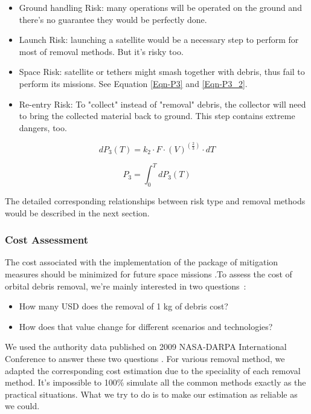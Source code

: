 \documentclass{mcmthesis}
\begin{document}
	\begin{itemize}
		\item Ground handling Risk: many operations will be operated on the ground and there's no guarantee they would be perfectly done.
		\item Launch Risk: launching a satellite would be a necessary step to perform for most of removal methods. But it's risky too.
		\item Space Risk: satellite or tethers might smash together with debris, thus fail to perform its missions. See Equation \eqref{Eqn-P3} and \eqref{Eqn-P3_2}.
		\item Re-entry Risk: To "collect" instead of "removal" debris, the collector will need to bring the collected material back to ground. This step contains extreme dangers, too.
	\end{itemize}
	
	\begin{equation}\label{Eqn-P3}
	d P_3(T) = k_2 \cdot F \cdot (V)^{(\frac{2}{3})} \cdot d T
	\end{equation}
	
	\begin{equation}\label{Eqn-P3_2}
	P_3 = \int_{0}^{T}	d P_3(T)
	\end{equation}		
	
	The detailed corresponding relationships between risk type and removal methods would be described in the next section.
	
\subsubsection{Cost Assessment}\label{Sec-Cost}
	The cost associated with the implementation of the package of mitigation measures should be minimized for future space missions \cite{Walker}.To assess the cost of orbital debris removal, we're mainly interested in two questions~\cite{Braun}:
	\begin{itemize}
		\item How many USD does the removal of 1 kg of debris cost?
		\item How does that value change for different scenarios and technologies?
	\end{itemize}
	
	We used the authority data published on 2009 NASA-DARPA International Conference to answer these two questions \cite{McKnight}. For various removal method, we adapted the corresponding cost estimation due to the speciality of each removal method. It's impossible to 100\% simulate all the common methods exactly as the practical situations. What we try to do is to make our estimation as reliable as we could.
	
\end{document}
